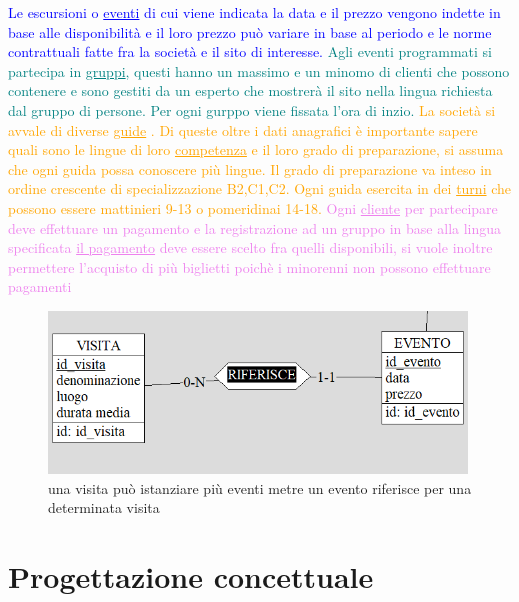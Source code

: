 \documentclass[a4paper,12pt]{report}
\begin{document}
\textcolor{blue}{Le escursioni o \underline{eventi} di cui viene indicata la data e il prezzo vengono
	indette in base alle disponibilità e il loro prezzo può variare in base al periodo e
	le norme contrattuali fatte fra la società e il sito di interesse.
}
\textcolor{teal}{
	Agli eventi programmati si partecipa in \underline{gruppi}, questi hanno un massimo e un minomo di clienti che
	possono contenere e sono gestiti da un esperto che mostrerà il sito nella lingua richiesta dal gruppo di persone.
	Per ogni gurppo viene fissata l'ora di inzio.
}
\textcolor{orange}{La società si avvale di diverse \underline{guide} . Di queste oltre i dati anagrafici è importante sapere quali sono
	le lingue di loro \underline{competenza} e il loro grado di preparazione, si assuma che ogni guida possa conoscere più lingue.
	Il grado di preparazione va inteso in ordine crescente di specializzazione B2,C1,C2.
	Ogni guida esercita in dei \underline{turni} che possono essere mattinieri 9-13 o pomeridinai 14-18.}
\textcolor{violet}{Ogni \underline{cliente} per partecipare deve
	effettuare un pagamento  e la registrazione ad un gruppo in base alla lingua specificata
	\underline{il pagamento} deve essere scelto fra quelli disponibili, si vuole inoltre
	permettere l'acquisto di più biglietti poichè i minorenni non possono effettuare pagamenti}
\textcolor{cyan}{}


\begin{figure}[H]
	\centering
	\includegraphics[width=0.99\textwidth]{visita-evento.png}
	\caption[short]{una visita può istanziare più eventi metre
		un evento riferisce per una determinata visita}
\end{figure}
\newpage
\chapter{Progettazione concettuale}
\end{document}

